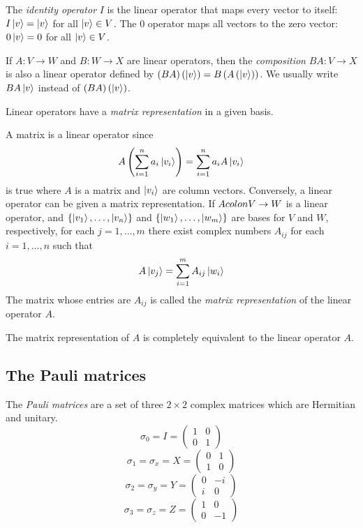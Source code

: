 The \emph{identity operator} $I$ is the linear operator that maps every vector to itself: $I\ket{v} = \ket{v}$ for all $\ket{v} \in V$.
The \num{0} operator maps all vectors to the zero vector: $0\ket{v} = 0$ for all $\ket{v} \in V$.

If $A\colon V \to W$ and $B\colon W \to X$ are linear operators, then the \emph{composition} $BA\colon V \to X$ is also a linear operator defined by $(BA)\left(\ket{v}\right) = B\left(A\left(\ket{v}\right)\right)$.
We usually write $BA\ket{v}$ instead of $(BA)\left(\ket{v}\right)$.

Linear operators have a \emph{matrix representation} in a given basis.

A matrix is a linear operator since
\[
    A\left(\sum_{i=1}^n a_i \ket{v_i}\right) = \sum_{i=1}^n a_i A\ket{v_i}
\]
is true where $A$ is a matrix and $\ket{v_i}$ are column vectors.
Conversely, a linear operator can be given a matrix representation.
If $A\\colon V \to W$ is a linear operator,
and $\{\ket{v_1}, \ldots, \ket{v_n}\}$ and $\{\ket{w_1}, \ldots, \ket{w_m}\}$ are bases for $V$ and $W$, respectively,
for each $j=1, \ldots, m$ there exist complex numbers $A_{ij}$ for each $i=1, \ldots, n$ such that
\[
    A\ket{v_j} = \sum_{i=1}^m A_{ij}\ket{w_i}
\]
The matrix whose entries are $A_{ij}$ is called the \emph{matrix representation} of the linear operator $A$.

The matrix representation of $A$ is completely equivalent to the linear operator $A$.

\subsection{The Pauli matrices}
The \emph{Pauli matrices} are a set of three $2 \times 2$ complex matrices which are Hermitian and unitary.
\[
    \sigma_0 = I = \begin{pmatrix}
        1 & 0 \\
        0 & 1
    \end{pmatrix}
\]
\[
    \sigma_1 = \sigma_x = X = \begin{pmatrix}
        0 & 1 \\
        1 & 0
    \end{pmatrix}
\]
\[
    \sigma_2 = \sigma_y = Y = \begin{pmatrix}
        0 & -i \\
        i & 0
    \end{pmatrix}
\]
\[
    \sigma_3 = \sigma_z = Z = \begin{pmatrix}
        1 & 0 \\
        0 & -1
    \end{pmatrix}
\]

